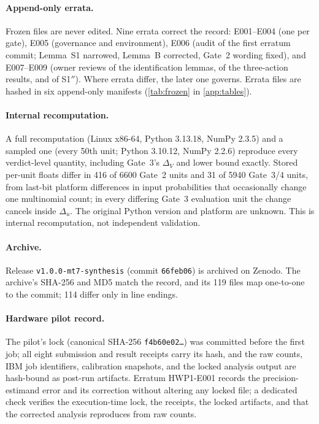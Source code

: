 \documentclass[10pt,twocolumn]{article}
\theoremstyle{definition}
\theoremstyle{remark}
\newcommand{\DV}{\Delta_V}
\begin{document}
\paragraph{Append-only errata.} Frozen files are never edited. Nine errata correct the record: E001--E004 (one per gate), E005 (governance and environment), E006 (audit of the first erratum commit; Lemma~S1 narrowed, Lemma~B corrected, Gate~2 wording fixed), and E007--E009 (owner reviews of the identification lemmas, of the three-action results, and of S1$''$). Where errata differ, the later one governs. Errata files are hashed in six append-only manifests (\cref{tab:frozen} in \cref{app:tables}).

\paragraph{Internal recomputation.} A full recomputation (Linux x86-64, Python 3.13.18, NumPy 2.3.5) and a sampled one (every 50th unit; Python 3.10.12, NumPy 2.2.6) reproduce every verdict-level quantity, including Gate~3's $\DV$ and lower bound exactly. Stored per-unit floats differ in 416 of 6600 Gate~2 units and 31 of 5940 Gate~3/4 units, from last-bit platform differences in input probabilities that occasionally change one multinomial count; in every differing Gate~3 evaluation unit the change cancels inside $\Delta_u$. The original Python version and platform are unknown. This is internal recomputation, not independent validation.

\paragraph{Archive.} Release \texttt{v1.0.0-mt7-synthesis} (commit \texttt{66feb06}) is archived on Zenodo. The archive's SHA-256 and MD5 match the record, and its 119 files map one-to-one to the commit; 114 differ only in line endings.

\paragraph{Hardware pilot record.} The pilot's lock (canonical SHA-256 \texttt{f4b60e02\dots}) was committed before the first job; all eight submission and result receipts carry its hash, and the raw counts, IBM job identifiers, calibration snapshots, and the locked analysis output are hash-bound as post-run artifacts. Erratum HWP1-E001 records the precision-estimand error and its correction without altering any locked file; a dedicated check verifies the execution-time lock, the receipts, the locked artifacts, and that the corrected analysis reproduces from raw counts.
\end{document}
